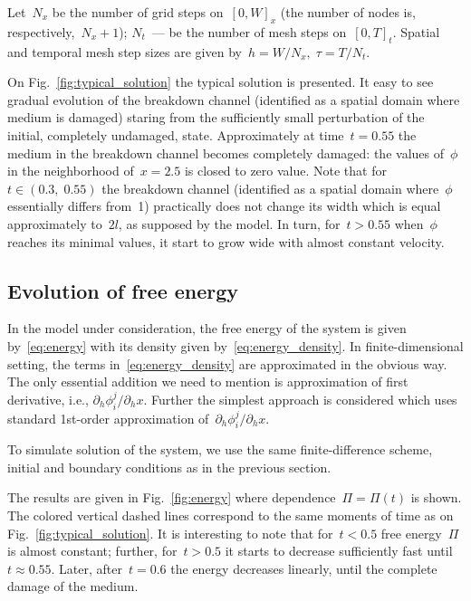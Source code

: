 Let~$N_x$ be the number of grid steps on~$[0, W]_x$ (the number of
nodes is, respectively,~$N_x + 1$);
$N_t$~--- be the number of mesh steps on~$[0, T]_t$.
Spatial and temporal mesh step sizes are given by~$h = W / N_x, \; \tau = T / N_t$.

On Fig.~\ref{fig:typical_solution} the typical solution is presented.
It easy to see gradual evolution of the breakdown channel
(identified as a spatial domain where medium is damaged)
staring from the sufficiently small perturbation
of the initial, completely undamaged, state.
Approximately at time~$t = 0.55$ the medium in the breakdown channel
becomes completely damaged: the values of~$\phi$ in the neighborhood
of~$x = 2.5$
is closed to zero value.
Note that for~$t \in (0.3, \; 0.55)$ the breakdown channel
(identified as a spatial domain where~$\phi$ essentially differs from~1)
practically does not change its width which is equal approximately
to~$2l$, as supposed by the model. In turn, for~$t > 0.55$
when~$\phi$  reaches its minimal values, it start to
grow wide with almost constant velocity.


\subsection{Evolution of free energy}

In the model under consideration, the free energy of the system is given
by~\eqref{eq:energy} with its density given by~\eqref{eq:energy_density}.
In finite-dimensional setting, the terms in~\eqref{eq:energy_density}
are approximated in the obvious way. 
The only essential addition we need to mention is approximation of
first derivative, i.e., 
$\partial_h \phi_i^j / \partial_h x$.
Further the simplest approach is considered which uses standard
1st-order approximation of~$\partial_h \phi_i^j / \partial_h x$.

To simulate solution of the system, we use the same
finite-difference scheme, initial and boundary conditions as in the
previous section.

The results are given in Fig.~\ref{fig:energy} where
dependence~$\Pi = \Pi(t)$ is shown.
The colored vertical dashed lines correspond to the same moments of time as on Fig.~\ref{fig:typical_solution}. 
It is interesting to note that for~$t < 0.5$ free energy~$\Pi$ is
almost constant; further, for~$t > 0.5$ it starts to decrease
sufficiently fast until~$t \approx 0.55$. Later, after~$t = 0.6$ the
energy decreases linearly, until the complete damage of the medium.

